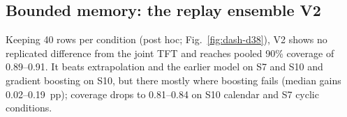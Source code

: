 \subsection{Bounded memory: the replay ensemble V2}
\label{sec:res-d38}

Keeping 40 rows per condition (post hoc; Fig.~\ref{fig:dash-d38}), V2 shows no replicated difference from the joint TFT and reaches pooled 90\% coverage of 0.89--0.91. It beats extrapolation and the earlier model on S7 and S10 and gradient boosting on S10, but there mostly where boosting fails (median gains 0.02--0.19~pp); coverage drops to 0.81--0.84 on S10 calendar and S7 cyclic conditions.
